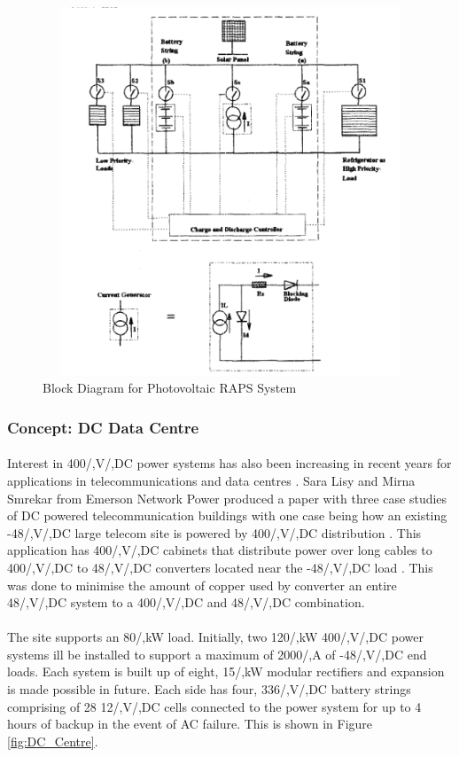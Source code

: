 \begin{figure}[H]
\hfill\includegraphics[width = 140mm, height = 110mm]{images/RAPS_Block}\hspace*{\fill}
\caption{{Block Diagram for Photovoltaic RAPS System \cite{Zahedi}}}
\label{fig:RAPS_Block}
\end{figure}        


\subsubsection{Concept: DC Data Centre}

\paragraph{}
Interest in 400/,V/,DC power systems has also been increasing in recent years for applications in telecommunications and data centres \cite{Lisy2015}. Sara Lisy and Mirna Smrekar from Emerson Network Power produced a paper with three case studies of DC powered telecommunication buildings with one case being how an existing -48/,V/,DC large telecom site is powered by 400/,V/,DC distribution \cite{Lisy2015}. This application has 400/,V/,DC cabinets that distribute power over long cables to 400/,V/,DC to 48/,V/,DC converters located near the -48/,V/,DC load \cite{Lisy2015}. This was done to minimise the amount of copper used by converter an entire 48/,V/,DC system to a 400/,V/,DC and 48/,V/,DC combination.

\paragraph{}
The site supports an 80/,kW load. Initially, two 120/,kW 400/,V/,DC power systems ill be installed to support a maximum of 2000/,A of -48/,V/,DC end loads. Each system is built up of eight, 15/,kW modular rectifiers and expansion is made possible in future. Each side has four, 336/,V/,DC battery strings comprising of 28 12/,V/,DC cells connected to the power system for up to 4 hours of backup in the event of AC failure. This is shown in Figure \ref{fig:DC_Centre}. 

